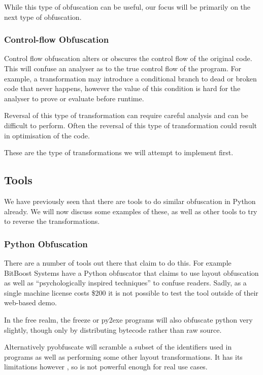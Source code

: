 \documentclass{report}
\begin{document}
While this type of obfuscation can be useful, our focus will be primarily on the next type of obfuscation.

\subsubsection{Control-flow Obfuscation}

Control flow obfuscation alters or obscures the control flow of the original code. This will confuse an analyser as to the
true control flow of the program. For example, a transformation may introduce a conditional branch to dead or broken code
that never happens, however the value of this condition is hard for the analyser to prove or evaluate before runtime.

Reversal of this type of transformation can require careful analysis and can be difficult to perform. Often the reversal
of this type of transformation could result in optimisation of the code.

These are the type of transformations we will attempt to implement first.

\subsection{Tools}

We have previously seen that there are tools to do similar obfuscation in Python already. We will now discuss some
examples of these, as well as other tools to try to reverse the transformations.

\subsubsection{Python Obfuscation}

There are a number of tools out there that claim to do this. For example BitBoost Systems have a Python obfuscator \cite{bitboost}
that claims to use layout obfuscation as well as ``psychologically inspired techniques'' to confuse readers. Sadly, as a
single machine license costs \$200 it is not possible to test the tool outside of their web-based demo.

In the free realm, the freeze \cite{freezereadme} or py2exe \cite{py2exe} programs will also obfuscate python very slightly,
though only by distributing bytecode rather than raw source.

Alternatively pyobfuscate \cite{pyobf} will scramble a subset of the identifiers used in programs as well as performing
some other layout transformations. It has its limitations however \cite{pyobf}, so is not powerful enough for real use cases.
\end{document}
